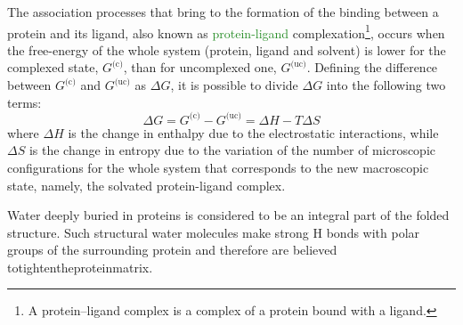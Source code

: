 The association processes that bring to the formation of the binding between a protein and its ligand, also known as \textcolor{ForestGreen}{protein-ligand} complexation\footnote{A protein–ligand complex is a complex of a protein bound with a ligand.}, occurs when the free-energy of the whole system (protein, ligand and solvent) is lower for the complexed state, $G^\text{(c)}$, than for uncomplexed one, $G^\text{(uc)}$. Defining the difference between $G^\text{(c)}$ and $G^\text{(uc)}$ as $\Delta G$, it is possible to divide $\Delta G$ into the following two terms:
\begin{equation*}
\label{free-en}
\Delta G = G^\text{(c)} - G^\text{(uc)} = \Delta H - T \Delta S
\end{equation*}
where $\Delta H$ is the change in enthalpy due to the electrostatic interactions, while $\Delta S$ is the change in entropy due to the variation of the number of microscopic configurations for the whole system that corresponds to the new macroscopic state, namely, the solvated protein-ligand complex.

Water deeply buried in proteins is considered to be an integral part of the folded structure. Such structural water molecules make strong H bonds with polar groups of the surrounding protein and therefore are believed totightentheproteinmatrix.

